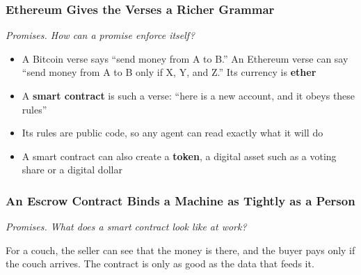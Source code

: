 \documentclass[aspectratio=169]{beamer}
\newcommand{\lead}[1]{{\small\itshape\textcolor{gtnavy!80}{#1}}\par\vspace{1.5mm}}
\newcommand{\bi}{\begin{itemize}}
\newcommand{\ei}{\end{itemize}}
\newcommand{\m}{\item}
\begin{document}
\begin{frame}[label=main-ethereum]
\frametitle{Ethereum Gives the Verses a Richer Grammar}
\lead{Promises. How can a promise enforce itself?}

\bi
\m A Bitcoin verse says ``send money from A to B.'' An Ethereum verse can say ``send money from A to B only if X, Y, and Z.'' Its currency is \textbf{ether}
\m A \textbf{smart contract} is such a verse: ``here is a new account, and it obeys these rules''
\m Its rules are public code, so any agent can read exactly what it will do
\m A smart contract can also create a \textbf{token}, a digital asset such as a voting share or a digital dollar
\ei
\end{frame}


\begin{frame}[label=main-escrow]
\frametitle{An Escrow Contract Binds a Machine as Tightly as a Person}
\lead{Promises. What does a smart contract look like at work?}

\begin{center}
\end{center}

\vspace{1mm}
For a couch, the seller can see that the money is there, and the buyer pays only if the couch arrives. The contract is only as good as the data that feeds it.
\end{frame}
\end{document}
